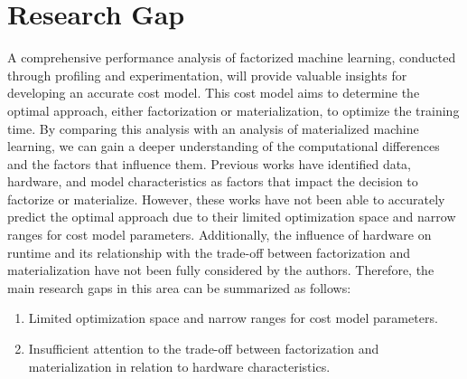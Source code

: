 \section{Research Gap}
A comprehensive performance analysis of factorized machine learning, conducted through profiling and experimentation, will provide valuable insights for developing an accurate cost model. This cost model aims to determine the optimal approach, either factorization or materialization, to optimize the training time. By comparing this analysis with an analysis of materialized machine learning, we can gain a deeper understanding of the computational differences and the factors that influence them. Previous works have identified data, hardware, and model characteristics as factors that impact the decision to factorize or materialize. However, these works have not been able to accurately predict the optimal approach due to their limited optimization space and narrow ranges for cost model parameters. Additionally, the influence of hardware on runtime and its relationship with the trade-off between factorization and materialization have not been fully considered by the authors. Therefore, the main research gaps in this area can be summarized as follows:
\begin{enumerate}
	\item Limited optimization space and narrow ranges for cost model parameters.
	\item Insufficient attention to the trade-off between factorization and materialization in relation to hardware characteristics.
\end{enumerate}